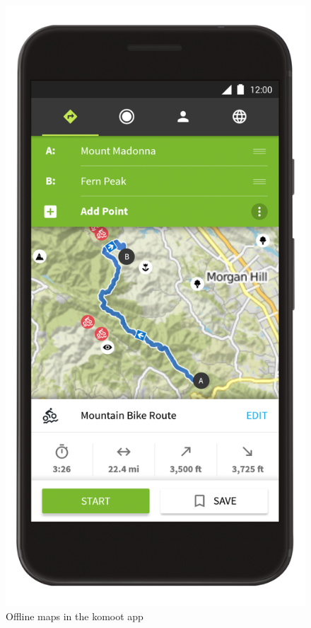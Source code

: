 \begin{figure}[h]
    \includegraphics[width=\textwidth]{Images/komoot-nav.png}
    \caption{Offline maps in the komoot app\cite{komoot-nav-img}}
\end{figure}

